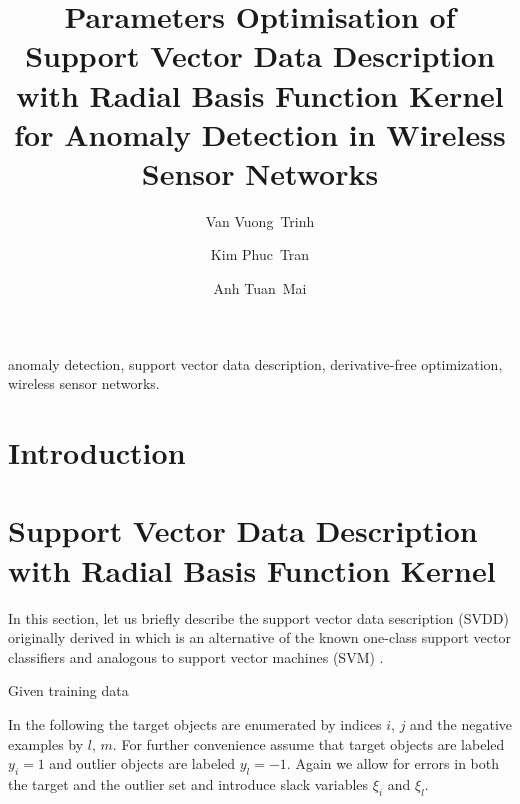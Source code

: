 \documentclass[3p,times]{elsarticle}
\begin{document}
\begin{frontmatter}

\title{Parameters Optimisation of Support Vector Data Description with Radial Basis Function Kernel for Anomaly Detection in Wireless Sensor Networks}

\author[donga]{Van Vuong~Trinh}

\author[donga]{Kim Phuc~Tran}

\author[hust]{Anh Tuan~Mai}

\address[donga]{Dong A University, Vietnam}  
\address[hust]{International Training Institute for Materials Science (ITIMS)\\Hanoi University of Technology, Vietnam} 

\begin{keyword}
anomaly detection, support vector data description, derivative-free optimization, wireless sensor networks.
\end{keyword}

\begin{abstract}
\end{abstract}

\end{frontmatter}

\section{Introduction}

\section{Support Vector Data Description with Radial Basis Function Kernel}

In this section, let us briefly describe the support vector data sescription (SVDD) originally derived in \cite{Tax2004} which is an alternative of the known one-class support vector classifiers \cite{Scholkopf2000} and analogous to support vector machines (SVM) \cite{Vapnik1998}.

Given training data

In the following the target objects are enumerated by indices $i$, $j$ and the negative examples by $l$, $m$. For further convenience assume that target objects are labeled $y_i=1$ and outlier objects are labeled $y_l=−1$. Again we allow for errors in both the target and the outlier set and introduce slack variables $\xi_i$ and $\xi_l$.
\end{document}
